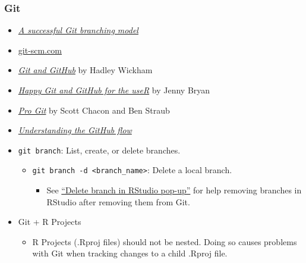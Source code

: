 \documentclass[
]{book}
\providecommand{\tightlist}{%
  \setlength{\itemsep}{0pt}\setlength{\parskip}{0pt}}
\begin{document}
\hypertarget{git}{%
\subsubsection{Git}\label{git}}

\begin{itemize}
\item
  \href{https://nvie.com/posts/a-successful-git-branching-model/}{\emph{A successful Git branching model}}
\item
  \href{https://git-scm.com/}{git-scm.com}
\item
  \href{http://r-pkgs.had.co.nz/git.html\#git-learning}{\emph{Git and GitHub}} by Hadley Wickham
\item
  \href{http://happygitwithr.com/}{\emph{Happy Git and GitHub for the useR}} by Jenny Bryan
\item
  \href{https://git-scm.com/book/en/v2}{\emph{Pro Git}} by Scott Chacon and Ben Straub
\item
  \href{https://guides.github.com/introduction/flow/}{\emph{Understanding the GitHub flow}}
\item
  \texttt{git\ branch}: List, create, or delete branches.

  \begin{itemize}
  \tightlist
  \item
    \texttt{git\ branch\ -d\ \textless{}branch\_name\textgreater{}}: Delete a local branch.

    \begin{itemize}
    \tightlist
    \item
      See \href{https://community.rstudio.com/t/delete-branch-in-rstudio-pop-up/15465}{``Delete branch in RStudio pop-up''} for help removing branches in RStudio after removing them from Git.
    \end{itemize}
  \end{itemize}
\item
  Git + R Projects

  \begin{itemize}
  \tightlist
  \item
    R Projects (.Rproj files) should not be nested. Doing so causes problems with Git when tracking changes to a child .Rproj file.
  \end{itemize}
\end{itemize}

  
\end{document}

